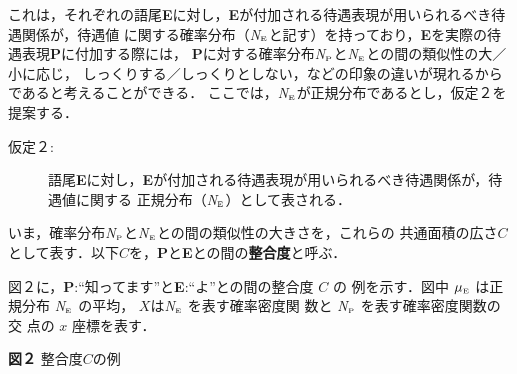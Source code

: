 これは，それぞれの語尾{\bf E}に対し，{\bf E}が付加される待遇表現が用いられるべき待遇関係が，待遇値
に関する確率分布\hspace{-0.5mm}（{\em N}\(_{\mbox{\tiny{E}}}\)と記す）\hspace{-0.5mm}を持っており，{\bf E}を実際の待遇表現{\bf P}に付加する際には，
{\bf P}に対する確率分布{\em N}\(_{\mbox{\tiny{P}}}\)と{\em N}\(_{\mbox{\tiny{E}}}\)との間の類似性の大／小に応じ，
しっくりする／しっくりとしない，などの印象の違いが現れるからであると考えることができる．
ここでは，{\em N}\(_{\mbox{\tiny{E}}}\)が正規分布であるとし，仮定２を提案する．

\medskip

\begin{description}
\item[仮定２:]語尾{\bf E}に対し，{\bf E}が付加される待遇表現が用いられるべき待遇関係が，待遇値に関する
正規分布（{\em N}\(_{\mbox{\tiny{E}}}\)）として表される．
\end{description}

\medskip

いま，確率分布{\em N}\(_{\mbox{\tiny{P}}}\)と{\em N}\(_{\mbox{\tiny{E}}}\)との間の類似性の大きさを，これらの
共通面積の広さ\(C\)として表す．以下\(C\)を，{\bf P}と{\bf E}との間の{\bf 整合度}と呼ぶ．

図２に，{\bf P}:``知ってます''と{\bf E}:``よ''との間の整合度\hspace{-0.5mm} \(C\)\hspace{-0.5mm} の
例を示す．図中\hspace{-0.5mm} \(\mu_{\mbox{\tiny{E}}}\)\hspace{-0.5mm} は正規分布\hspace{-0.5mm} 
{\em N}\(_{\mbox{\tiny{E}}}\)\hspace{-0.5mm} の平均，\hspace{-0.5mm}
\(X\)は{\em N}\(_{\mbox{\tiny{E}}}\)\hspace{-0.5mm} を表す確率密度関
数と\hspace{-0.5mm} 
{\em N}\(_{\mbox{\tiny{P}}}\)\hspace{-0.5mm} を表す確率密度関数の交
点の\hspace{-0.5mm} \(x\)\hspace{-0.5mm} 座標を表す．

\begin{center}

{\bf 図２} 整合度\(C\)の例
\end{center}

